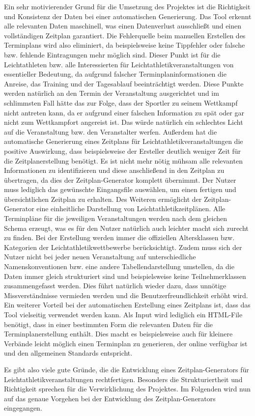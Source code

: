 Ein sehr motivierender Grund für die Umsetzung des Projektes ist die Richtigkeit und Konsistenz der Daten bei einer automatischen Generierung. Das Tool erkennt alle relevanten Daten maschinell, was einen Datenverlust ausschließt und einen vollständigen Zeitplan garantiert. Die Fehlerquelle beim manuellen Erstellen des Terminplans wird also eliminiert, da beispielsweise keine Tippfehler oder falsche bzw. fehlende Eintragungen mehr möglich sind. Dieser Punkt ist für die Leichtathleten bzw. alle Interessierten für Leichtathletikveranstaltungen von essentieller Bedeutung, da aufgrund falscher Terminplaninformationen die Anreise, das Training und der Tagesablauf beeinträchtigt werden. Diese Punkte werden natürlich an den Termin der Veranstaltung ausgerichtet und im schlimmsten Fall hätte das zur Folge, dass der Sportler zu seinem Wettkampf nicht antreten kann, da er aufgrund einer falschen Information zu spät oder gar nicht zum Wettkampfort angereist ist. Das würde natürlich ein schlechtes Licht auf die Veranstaltung bzw. den Veranstalter werfen.
Außerdem hat die automatische Generierung eines Zeitplans für Leichtathletikveranstaltungen die positive Auswirkung, dass beispielsweise der Ersteller deutlich weniger Zeit für die Zeitplanerstellung benötigt. Es ist nicht mehr nötig mühsam alle relevanten Informationen zu identifizieren und diese anschließend in den Zeitplan zu übertragen, da dies der Zeitplan-Generator komplett übernimmt. Der Nutzer muss lediglich das gewünschte Eingangsfile auswählen, um einen fertigen und übersichtlichen Zeitplan zu erhalten. 
Des Weiteren ermöglicht der Zeitplan-Generator eine einheitliche Darstellung von Leichtathletikzeitplänen. Alle Terminpläne für die jeweiligen Veranstaltungen werden nach dem gleichen Schema erzeugt, was es für den Nutzer natürlich auch leichter macht sich zurecht zu finden. Bei der Erstellung werden immer die offiziellen Altersklassen bzw. Kategorien der Leichtathletikwettbewerbe berücksichtigt. Zudem muss sich der Nutzer nicht bei jeder neuen Veranstaltung auf unterschiedliche Namenskonventionen bzw. eine andere Tabellendarstellung umstellen, da die Daten immer gleich strukturiert sind und beispielsweise keine Teilnehmerklassen zusammengefasst werden. Dies führt natürlich wieder dazu, dass unnötige Missverständnisse vermieden werden und die Benutzerfreundlichkeit erhöht wird.
Ein weiterer Vorteil bei der automatischen Erstellung eines Zeitplans ist, dass das Tool vielseitig verwendet werden kann. Als Input wird lediglich ein HTML-File benötigt, dass in einer bestimmten Form die relevanten Daten für die Terminplanerstellung enthält. Dies macht es beispielsweise auch für kleinere Verbände leicht möglich einen Terminplan zu generieren, der online verfügbar ist und den allgemeinen Standards entspricht.

Es gibt also viele gute Gründe, die die Entwicklung eines Zeitplan-Generators für Leichtathletikveranstaltungen rechtfertigen. Besonders die Strukturiertheit und Richtigkeit sprechen für die Verwirklichung des Projektes. Im Folgenden wird nun auf das genaue Vorgehen bei der Entwicklung des Zeitplan-Generators eingegangen.



